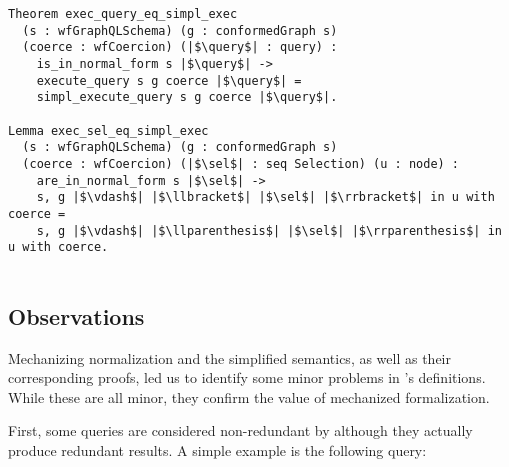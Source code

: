 \begin{verbatim}
Theorem exec_query_eq_simpl_exec 
  (s : wfGraphQLSchema) (g : conformedGraph s)
  (coerce : wfCoercion) (|$\query$| : query) : 
    is_in_normal_form s |$\query$| -> 
    execute_query s g coerce |$\query$| =
    simpl_execute_query s g coerce |$\query$|.
    
Lemma exec_sel_eq_simpl_exec
  (s : wfGraphQLSchema) (g : conformedGraph s) 
  (coerce : wfCoercion) (|$\sel$| : seq Selection) (u : node) :
    are_in_normal_form s |$\sel$| -> 
    s, g |$\vdash$| |$\llbracket$| |$\sel$| |$\rrbracket$| in u with coerce =
    s, g |$\vdash$| |$\llparenthesis$| |$\sel$| |$\rrparenthesis$| in u with coerce.
 
\end{verbatim}

 
\subsection{Observations}\label{subsec:norm_lims}

Mechanizing normalization and the simplified semantics, as well as their corresponding proofs, led us to identify some minor problems in \HP's definitions. While these are all minor, they confirm the value of mechanized formalization.

First, some queries are considered non-redundant by \HP although they actually produce redundant results.
A simple example is the following query:

